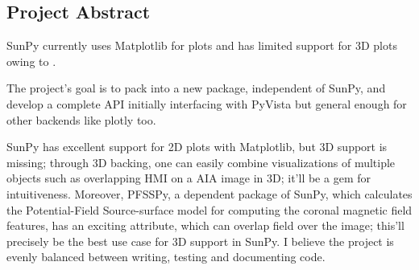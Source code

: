 \subsection{Project Abstract}
SunPy currently uses Matplotlib for plots and has limited support for 3D plots owing to \pr. 

The project's goal is to pack \pr into a new package, independent of SunPy, and develop a complete API initially interfacing with PyVista but general enough for other backends like plotly too. 

SunPy has excellent support for 2D plots with Matplotlib, but 3D support is missing; through 3D backing, one can easily combine visualizations of multiple objects such as overlapping HMI on a AIA image in 3D; it'll be a gem for intuitiveness. Moreover, PFSSPy, a dependent package of SunPy, which calculates the Potential-Field Source-surface model for computing the coronal magnetic field features, has an exciting attribute, which can overlap field over the image; this'll precisely be the best use case for 3D support in SunPy.
I believe the project is evenly balanced between writing, testing and documenting code.

